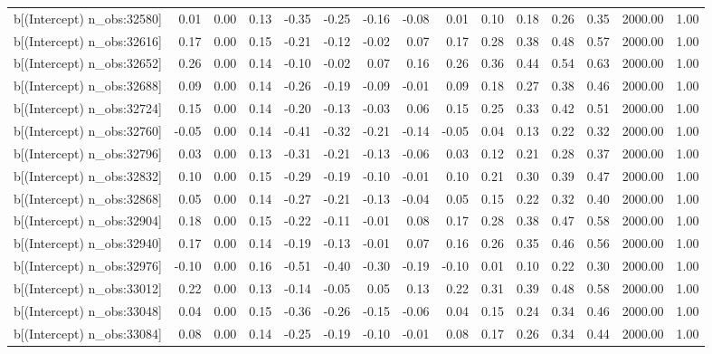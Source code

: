 \begin{table}[ht]
\begin{tabular}{rrrrrrrrrrrrrrr}
  b[(Intercept) n\_obs:32580] & 0.01 & 0.00 & 0.13 & -0.35 & -0.25 & -0.16 & -0.08 & 0.01 & 0.10 & 0.18 & 0.26 & 0.35 & 2000.00 & 1.00 \\ 
  b[(Intercept) n\_obs:32616] & 0.17 & 0.00 & 0.15 & -0.21 & -0.12 & -0.02 & 0.07 & 0.17 & 0.28 & 0.38 & 0.48 & 0.57 & 2000.00 & 1.00 \\ 
  b[(Intercept) n\_obs:32652] & 0.26 & 0.00 & 0.14 & -0.10 & -0.02 & 0.07 & 0.16 & 0.26 & 0.36 & 0.44 & 0.54 & 0.63 & 2000.00 & 1.00 \\ 
  b[(Intercept) n\_obs:32688] & 0.09 & 0.00 & 0.14 & -0.26 & -0.19 & -0.09 & -0.01 & 0.09 & 0.18 & 0.27 & 0.38 & 0.46 & 2000.00 & 1.00 \\ 
  b[(Intercept) n\_obs:32724] & 0.15 & 0.00 & 0.14 & -0.20 & -0.13 & -0.03 & 0.06 & 0.15 & 0.25 & 0.33 & 0.42 & 0.51 & 2000.00 & 1.00 \\ 
  b[(Intercept) n\_obs:32760] & -0.05 & 0.00 & 0.14 & -0.41 & -0.32 & -0.21 & -0.14 & -0.05 & 0.04 & 0.13 & 0.22 & 0.32 & 2000.00 & 1.00 \\ 
  b[(Intercept) n\_obs:32796] & 0.03 & 0.00 & 0.13 & -0.31 & -0.21 & -0.13 & -0.06 & 0.03 & 0.12 & 0.21 & 0.28 & 0.37 & 2000.00 & 1.00 \\ 
  b[(Intercept) n\_obs:32832] & 0.10 & 0.00 & 0.15 & -0.29 & -0.19 & -0.10 & -0.01 & 0.10 & 0.21 & 0.30 & 0.39 & 0.47 & 2000.00 & 1.00 \\ 
  b[(Intercept) n\_obs:32868] & 0.05 & 0.00 & 0.14 & -0.27 & -0.21 & -0.13 & -0.04 & 0.05 & 0.15 & 0.22 & 0.32 & 0.40 & 2000.00 & 1.00 \\ 
  b[(Intercept) n\_obs:32904] & 0.18 & 0.00 & 0.15 & -0.22 & -0.11 & -0.01 & 0.08 & 0.17 & 0.28 & 0.38 & 0.47 & 0.58 & 2000.00 & 1.00 \\ 
  b[(Intercept) n\_obs:32940] & 0.17 & 0.00 & 0.14 & -0.19 & -0.13 & -0.01 & 0.07 & 0.16 & 0.26 & 0.35 & 0.46 & 0.56 & 2000.00 & 1.00 \\ 
  b[(Intercept) n\_obs:32976] & -0.10 & 0.00 & 0.16 & -0.51 & -0.40 & -0.30 & -0.19 & -0.10 & 0.01 & 0.10 & 0.22 & 0.30 & 2000.00 & 1.00 \\ 
  b[(Intercept) n\_obs:33012] & 0.22 & 0.00 & 0.13 & -0.14 & -0.05 & 0.05 & 0.13 & 0.22 & 0.31 & 0.39 & 0.48 & 0.58 & 2000.00 & 1.00 \\ 
  b[(Intercept) n\_obs:33048] & 0.04 & 0.00 & 0.15 & -0.36 & -0.26 & -0.15 & -0.06 & 0.04 & 0.15 & 0.24 & 0.34 & 0.46 & 2000.00 & 1.00 \\ 
  b[(Intercept) n\_obs:33084] & 0.08 & 0.00 & 0.14 & -0.25 & -0.19 & -0.10 & -0.01 & 0.08 & 0.17 & 0.26 & 0.34 & 0.44 & 2000.00 & 1.00 \\ 

\end{tabular}
\end{table}
